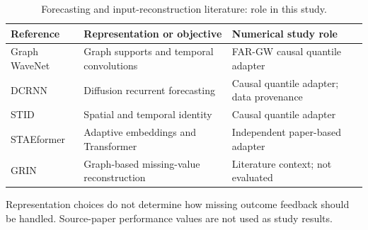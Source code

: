 \begin{table}[p]\caption{Forecasting and input-reconstruction literature: role in this study.}\label{tab:related-models}\centering\small
\begin{tabular}{>{\raggedright\arraybackslash}p{3.0cm}>{\raggedright\arraybackslash}p{4.3cm}>{\raggedright\arraybackslash}p{5.0cm}}\toprule
Reference & Representation or objective & Numerical study role \\\midrule
Graph WaveNet \citep{wu2019} & Graph supports and temporal convolutions & FAR-GW causal quantile adapter \\
DCRNN \citep{li2018} & Diffusion recurrent forecasting & Causal quantile adapter; data provenance \\
STID \citep{shao2022} & Spatial and temporal identity & Causal quantile adapter \\
STAEformer \citep{liu2023} & Adaptive embeddings and Transformer & Independent paper-based adapter \\
GRIN \citep{cini2022} & Graph-based missing-value reconstruction & Literature context; not evaluated \\
\bottomrule\end{tabular}\par\smallskip\footnotesize Representation choices do not determine how missing outcome feedback should be handled. Source-paper performance values are not used as study results.\end{table}\clearpage
